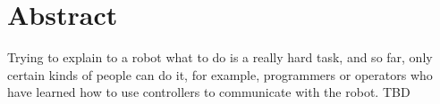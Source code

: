\documentclass[../thesis.tex]{subfiles}
\begin{document}
    \cleardoublepage
    \begingroup
    \let\clearpage\relax
    \let\cleardoublepage\relax

    \chapter*{Abstract}
    Trying to explain to a robot what to do is a really hard task, and so far, only certain kinds of people can do it, for example, programmers or operators who have learned how to use controllers to communicate with the robot. TBD

    \endgroup

    \vfill
\end{document}

